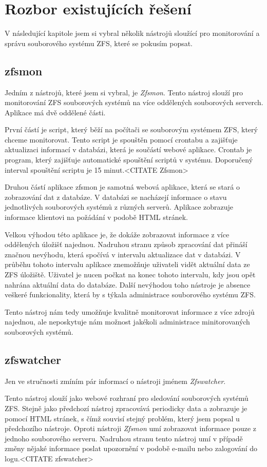 \section{Rozbor existujících řešení}
    V následující kapitole jsem si vybral několik nástrojů sloužící pro monitorování a správu souborového systému ZFS, které se pokusím popsat.
    \subsection{zfsmon}
    Jedním z nástrojů, které jsem si vybral, je \emph{Zfsmon}. Tento nástroj slouží pro monitorování ZFS souborových systémů na více oddělených souborových serverch. Aplikace má dvě oddělené části.
    
    První částí je script, který běží na počítači se souborovým systémem ZFS, který chceme monitorovat. Tento script je spouštěn pomocí crontabu a zajišťuje aktualizaci informací v databázi, která je součástí webové aplikace. Crontab je program, který zajišťuje automatické spouštění scriptů v systému. Doporučený interval spouštění scriptu je 15 minut.<CITATE Zfsmon>
    
    Druhou částí aplikace zfsmon je samotná webová aplikace, která se stará o zobrazování dat z databáze. V databázi se nacházejí informace o stavu jednotlivých souborových systémů z různých serverů. Aplikace zobrazuje informace klientovi na požádání v podobě HTML stránek.
    
    Velkou výhodou této aplikace je, že dokáže zobrazovat informace z více oddělených úložišť najednou. Nadruhou stranu způsob zpracování dat přináší značnou nevýhodu, která spočívá v intervalu aktualizace dat v databázi. V průběhu tohoto intervalu aplikace znemožňuje uživateli vidět aktuální data ze ZFS úložiště. Uživatel je nucen počkat na konec tohoto intervalu, kdy jsou opět nahrána aktuální data do databáze. Další nevýhodou toho nástroje je absence veškeré funkcionality, která by s týkala administrace souborového systému ZFS.
    
    Tento nástroj nám tedy umožňuje kvalitně monitorovat informace z více zdrojů najednou, ale neposkytuje nám možnost jakékoli administrace minitorovaných souborových systémů.     
    \subsection{zfswatcher}
    Jen ve stručnosti zmíním pár informací o nástroji jménem \emph{Zfswatcher}.
     
    Tento nástroj slouží jako webové rozhraní pro sledování souborových systémů ZFS. Stejně jako předchozí nástroj zpracovává periodicky data a zobrazuje je pomocí HTML stránek, s čímž souvisí stejný problém, který jsem popsal u předchozího nástroje. Oproti nástroji \emph{Zfsmon} umí zobrazovat informace pouze z jednoho souborového serveru. Nadruhou stranu tento nástroj umí v případě změny nějaké informace poslat upozornění v podobě e-mailu nebo zalogování do logu.<CITATE zfswatcher>
